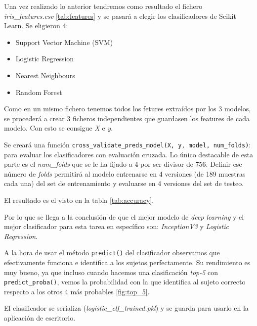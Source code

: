 Una vez realizado lo anterior tendremos como resultado el fichero \emph{iris\_features.csv} \ref{tab:features} y se pasará a elegir los clasificadores de Scikit Learn.
 Se eligieron 4:
 \begin{itemize}
     \item Support Vector Machine (SVM)
     \item Logistic Regression
     \item Nearest Neighbours
     \item Random Forest
 \end{itemize}
 
Como en un mismo fichero tenemos todos los fetures extraídos por los 3 modelos, se procederá a crear 3 ficheros independientes que guardasen los features de cada modelo. Con esto se consigue \emph{X} e \emph{y}.

 
 Se creará una función \texttt{cross\_validate\_preds\_model(X, y, model, num\_folds)}: para evaluar los clasificadores con evaluación cruzada. Lo único destacable de esta parte es el \emph{num\_folds} que se le ha fijado a 4 por ser divisor de 756. Definir ese número de \emph{folds} permitirá al modelo entrenarse en 4 versiones (de 189 muestras cada una) del set de entrenamiento y evaluarse en 4 versiones del set de testeo.
 
 El resultado es el visto en la tabla \ref{tab:accuracy}.
 
 Por lo que se llega a la conclusión de que el mejor modelo de \emph{deep learning} y el mejor clasificador para esta tarea en específico son: \emph{InceptionV3} y \emph{Logistic Regression}.
 
 A la hora de usar el método \texttt{predict()} del clasificador observamos que efectivamente funciona e identifica a los sujetos perfectamente.
 Su rendimiento es muy bueno, ya que incluso cuando hacemos una clasificación \emph{top-5} con \texttt{predict\_proba()}, vemos la probabilidad con la que identifica al sujeto correcto respecto a los otros 4 más probables \ref{fig:top_5}.
 
 El clasificador se serializa (\emph{logistic\_clf\_trained.pkl}) y se guarda para usarlo en la aplicación de escritorio.
